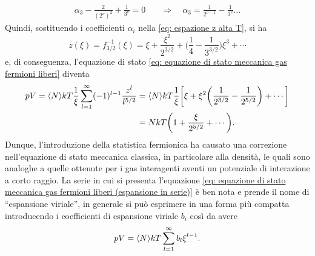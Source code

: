\begin{caso}
\begin{align}
        \alpha_3 - \frac{2}{(2^\nu)^2} + \frac{1}{3^\nu} = 0\quad&\Longrightarrow\quad \alpha_3 = \frac{1}{2^{\nu-1}} - \frac{1}{3^\nu}\dots
    \end{align}
    Quindi, sostituendo i coefficienti $\alpha_i$ nella \eqref{eq: espazione z alta T}, si ha
    \begin{equation}
        z(\xi) = f_{3/2}^{-1}(\xi) = \xi + \frac{\xi^2}{2^{3/2}} + \bigg(\frac{1}{4} - \frac{1}{3^{3/2}}\bigg)\xi^3 + \cdots
    \end{equation}
    e, di conseguenza, l'equazione di stato \eqref{eq: equazione di stato meccanica gas fermioni liberi} diventa
    \begin{equation}
    \label{eq: equazione di stato meccanica gas fermioni liberi (espansione in serie)}
        \begin{split}
            pV = \langle N \rangle kT\frac{1}{\xi}\sum_{l=1}^\infty(-1)^{l-1}\frac{z^l}{l^{5/2}} &= \langle N \rangle kT\frac{1}{\xi}\bigg[\xi + \xi^2 \bigg(\frac{1}{2^{3/2}} - \frac{1}{2^{5/2}}\bigg) + \cdots\bigg] \\
            &= NkT\bigg(1+ \frac{\xi}{2^{5/2}} + \cdots\bigg).
        \end{split}
    \end{equation}
    Dunque, l'introduzione della statistica fermionica ha causato una correzione nell'equazione di stato meccanica classica, in particolare alla densità, le quali sono analoghe a quelle ottenute per i gas interagenti aventi un potenziale di interazione a corto raggio. La serie in cui si presenta l'equazione \eqref{eq: equazione di stato meccanica gas fermioni liberi (espansione in serie)} è ben nota e prende il nome di ``espansione viriale'', in generale si può esprimere in una forma più compatta introducendo i coefficienti di espansione viriale $b_i$ così da avere
    \begin{equation}
        pV = \langle N \rangle kT\sum_{l=1}^\infty b_l\xi^{l-1}.
    \end{equation}
\end{caso}

